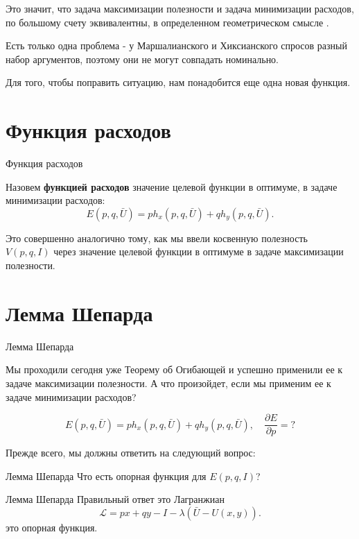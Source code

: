 \documentclass{beamer}
\begin{document}
\begin{frame}
Это значит, что задача максимизации полезности и задача минимизации расходов, по большому счету эквивалентны, в определенном геометрическом смысле . 

Есть только одна проблема - у Маршалианского и Хиксианского спросов разный набор аргументов, поэтому они не могут совпадать номинально. 

Для того, чтобы поправить ситуацию, нам понадобится еще одна новая функция.
\end{frame}

\section{Функция расходов}

\begin{frame}{Функция расходов}

\begin{definition}
Назовем \textbf{функцией расходов} значение целевой функции в оптимуме, в задаче минимизации расходов:
$$ E(p,q,\bar U) = p h_x(p,q,\bar U) + q h_y(p,q,\bar U).$$
\end{definition}

Это совершенно аналогично тому, как мы ввели косвенную полезность $V(p,q,I)$ через значение целевой функции в оптимуме в задаче максимизации полезности.
\end{frame}

\section{Лемма Шепарда}

\begin{frame}{Лемма Шепарда}

Мы проходили сегодня уже Теорему об Огибающей и успешно применили ее к задаче максимизации полезности. А что произойдет, если мы применим ее к задаче минимизации расходов?

$$ E(p,q,\bar U) = p h_x(p,q,\bar U) + q h_y(p,q,\bar U), \quad \frac{\partial E}{\partial p} = ?$$

Прежде всего, мы должны ответить на следующий вопрос:
\end{frame}

\begin{frame}{Лемма Шепарда}
Что есть опорная функция для $E(p,q,I)$?
\end{frame}

\begin{frame}{Лемма Шепарда}
Правильный ответ это Лагранжиан 
$$\mathcal{L}=px + qy - I - \lambda(\bar U - U(x,y)).$$
это опорная функция.
\end{frame}
\end{document}
